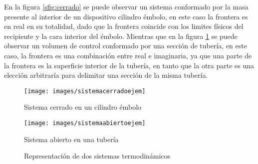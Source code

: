 \documentclass[../master.tex]{subfiles}
\begin{document}
En la figura \ref{sfig:cerrado} se puede observar un sistema conformado por la masa presente al interior de un dispositivo cilindro émbolo, en este caso la frontera es en real en su totalidad, dado que la frontera coincide con los limites físicos del recipiente y la cara interior del émbolo. Mientras que en la figura \ref{sfig:abierto} se puede observar un volumen de control conformado por una sección de tubería, en este caso, la frontera es una combinación entre real e imaginaria, ya que una parte de la frontera es la superficie interior de la tubería, en tanto que la otra parte es una elección arbitraría para delimitar una sección de la misma tubería.

\begin{figure}[htbp]
    \centering
    \begin{subcaptionblock}{0.4\linewidth}
        \centering
        \texttt{[image: images/sistemacerradoejem]}
        \caption{Sistema cerrado en un cilindro émbolo}
        \label{sfig:cerrado}
    \end{subcaptionblock}
    \begin{subcaptionblock}{0.4\linewidth}
        \centering
        \texttt{[image: images/sistemaabiertoejem]}
        \caption{Sistema abierto en una tubería}
        \label{sfig:abierto}
    \end{subcaptionblock}
    \caption{Representación de dos sistemas termodinámicos}
\end{figure}


\clearpage
\renewcommand{\nomname}{Nomenclatura del capítlo}
\printnomenclature

\printbibliography[title=Bibliografía del capítulo]
\end{document}
